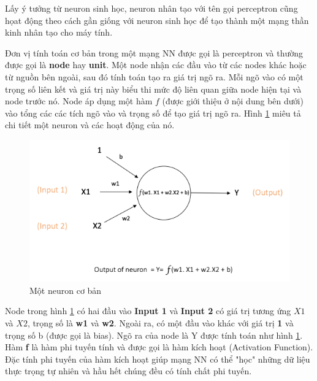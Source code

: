 Lấy ý tưởng từ neuron sinh học, neuron nhân tạo với tên gọi perceptron cũng họat động theo cách gần giống với neuron sinh học để tạo thành một mạng thần kinh nhân tạo cho máy tính.

Đơn vị tính toán cơ bản trong một mạng NN được gọi là perceptron và thường được gọi là \textbf{node} hay \textbf{unit}. Một node nhận các đầu vào từ các nodes khác hoặc từ nguồn bên ngoài, sau đó tính toán tạo ra giá trị ngõ ra. Mỗi ngõ vào có một trọng số liên kết và giá trị này biểu thi mức độ liên quan giữa node hiện tại và node trước nó. Node áp dụng một hàm $f$ (được giới thiệu ở nội dung bên dưới) vào tổng các các tích ngõ vào và trọng số để tạo giá trị ngõ ra. Hình \ref{fig:single_neuron} miêu tả chi tiết một neuron và các hoạt động của nó.

\FloatBarrier
\begin{figure}[htp]
\begin{center}
\includegraphics[scale=1]{chap2/c2_figs/single_neuron.PNG}
\end{center}
\caption{Một neuron cơ bản}
\label{fig:single_neuron}
\end{figure}
\FloatBarrier

Node trong hình \ref{fig:single_neuron} có hai đầu vào \textbf{Input 1} và \textbf{Input 2} có giá trị tương ứng $X1$ và $X2$, trọng số là \textbf{w1} và \textbf{w2}. Ngoài ra, có một đầu vào khác với giá trị \textbf{1} và trọng số b (được gọi là bias). Ngõ ra của node là Y được tính toán như hình \ref{fig:single_neuron}. Hàm \textbf{f} là hàm phi tuyến tính và được gọi là hàm kích hoạt (Activation Function). Đặc tính phi tuyến của hàm kích hoạt giúp mạng NN có thể "học" những dữ liệu thực trọng tự nhiên và hầu hết chúng đều có tính chất phi tuyến.

